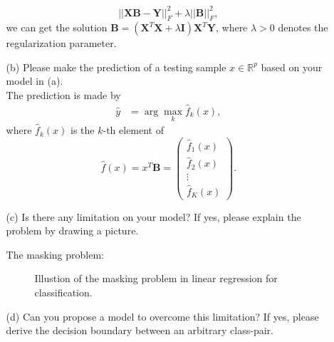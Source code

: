 \documentclass[10pt]{article}
\begin{document}
\begin{enumerate}[1.]
\begin{itemize}
{                    \begin{equation*}
                     ||\mathbf{X}\mathbf{B}-\mathbf{Y}||_F^2+\lambda||\mathbf{B}||_F^2,
                    \end{equation*}
                    we can get the solution $\mathbf{B} = (\mathbf{X}^T\mathbf{X}+\lambda \mathbf{I})\mathbf{X}^T\mathbf{Y}$, 
                    where $\lambda > 0$ denotes the regularization parameter.
                    }
              \item[(b)] Please make the prediction of a testing sample $x \in \mathbb{R}^p$ based on your model in (a). ~\\
                    {\color{blue} 
                    The prediction is made by
                    \begin{align*}
                        \hat y & = \arg\max_k \hat{f}_k(x),
                    \end{align*}
                    where $\hat{f}_k(x)$ is the $k$-th element of 
                    \begin{equation*}
                        \hat f(x) =x^T \mathbf{B} =\begin{pmatrix}
                            \hat f_1(x) \\ \hat f_2(x) \\ \vdots \\ \hat f_K(x)
                        \end{pmatrix}.
                    \end{equation*}
                    }
              \item[(c)] Is there any limitation on your model? If yes, please explain the problem by drawing a picture. ~\\
                    { \color{blue}
                    The masking problem:
                    \begin{figure}[H]
                        \centerline{
                            \hfil
                        }
                    \caption{Illustion of the masking problem in linear regression for classification.}                        
                    \end{figure}
                    }
              \item[(d)] Can you propose a model to overcome this limitation? If yes, please derive the decision boundary between an arbitrary class-pair. ~\\

\end{itemize}
\end{enumerate}
\end{document}
